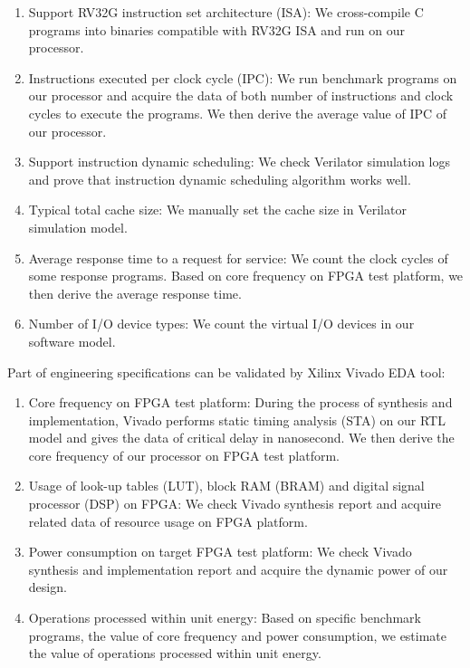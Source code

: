 \begin{enumerate}
    \item Support RV32G instruction set architecture (ISA): We cross-compile C programs into binaries compatible with RV32G ISA and run on our processor.
    \item Instructions executed per clock cycle (IPC): We run benchmark programs on our processor and acquire the data of both number of instructions and clock cycles to execute the programs. We then derive the average value of IPC of our processor.
    \item Support instruction dynamic scheduling: We check Verilator simulation logs and prove that instruction dynamic scheduling algorithm works well.
    \item Typical total cache size: We manually set the cache size in Verilator simulation model.
    \item Average response time to a request for service: We count the clock cycles of some response programs. Based on core frequency on FPGA test platform, we then derive the average response time.
    \item Number of I/O device types: We count the virtual I/O devices in our software model.
\end{enumerate}

Part of engineering specifications can be validated by Xilinx Vivado EDA tool:

\begin{enumerate}
    \item Core frequency on FPGA test platform: During the process of synthesis and implementation, Vivado performs static timing analysis (STA) on our RTL model and gives the data of critical delay in nanosecond. We then derive the core frequency of our processor on FPGA test platform.
    \item Usage of look-up tables (LUT), block RAM (BRAM) and digital signal processor (DSP) on FPGA: We check Vivado synthesis report and acquire related data of resource usage on FPGA platform.
    \item Power consumption on target FPGA test platform: We check Vivado synthesis and implementation report and acquire the dynamic power of our design.
    \item Operations processed within unit energy: Based on specific benchmark programs, the value of core frequency and power consumption, we estimate the value of operations processed within unit energy.
\end{enumerate}


